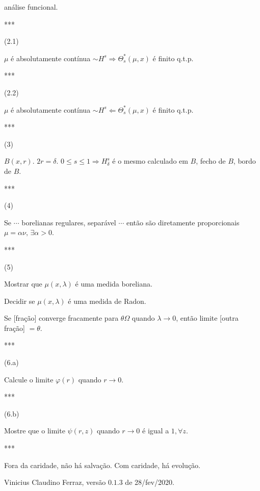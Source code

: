 \documentclass[12pt]{article}
\begin{document}
an\'alise funcional.

***

\vspace{3mm}

(2.1)

$\mu$ \'e absolutamente cont\'inua $\sim H^s \Rightarrow \Theta^*_s(\mu, x)$ \'e finito q.t.p.

***

\vspace{3mm}

(2.2)

$\mu$ \'e absolutamente cont\'inua $\sim H^s \Leftarrow \Theta^*_s(\mu, x)$ \'e finito q.t.p.

***

\vspace{3mm}

(3)

$B(x, r)$. $2r = \delta$. $0 \le s \le 1 \Rightarrow H^s_\delta$ \'e o mesmo calculado em $B$, fecho de $B$, bordo de $B$.

***

\vspace{3mm}

(4)

Se $\cdots$ borelianas regulares, separ\'avel $\cdots$ ent\~ao s\~ao diretamente proporcionais $\mu = \alpha \nu,\,\exists \alpha > 0$.

***

\vspace{3mm}

(5)

Mostrar que $\mu(x, \lambda)$ \'e uma medida boreliana.

Decidir se $\mu(x, \lambda)$ \'e uma medida de Radon.

Se [fra\c{c}\~ao] converge fracamente para $\theta \Omega$ quando $\lambda \to 0$, ent\~ao limite [outra fra\c{c}\~ao] $= \theta$.

***

\vspace{3mm}

(6.a)

Calcule o limite $\varphi(r)$ quando $r \to 0$.

***

\vspace{3mm}

(6.b)

Mostre que o limite $\psi(r, z)$ quando $r \to 0$ \'e igual a $1, \forall z$.

***

\vspace{3mm}

Fora da caridade, n\~ao h\'a salva\c{c}\~ao. Com caridade, h\'a evolu\c{c}\~ao.

Vinicius Claudino Ferraz, vers\~ao $0.1.3$ de 28/fev/2020.
\end{document}
